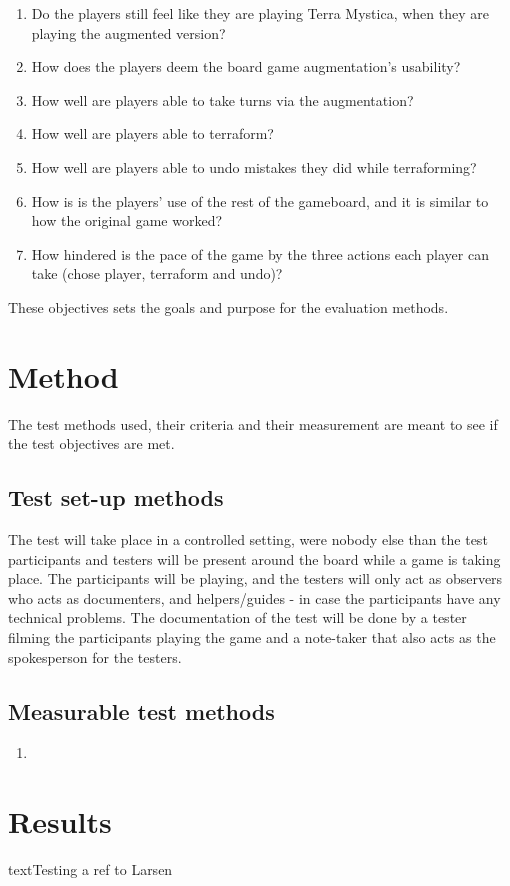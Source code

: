 \begin{enumerate}
\item Do the players still feel like they are playing Terra Mystica, when they are playing the augmented version? 
\item How does the players deem the board game augmentation's usability?
\item How well are players able to take turns via the augmentation? 
\item How well are players able to terraform? 
\item How well are players able to undo mistakes they did while terraforming?
\item How is is the players' use of the rest of the gameboard, and it is similar to how the original game worked?
\item How hindered is the pace of the game by the three actions each player can take (chose player, terraform and undo)?
\end{enumerate}

These objectives sets the goals and purpose for the evaluation methods. 

\section{Method}
The test methods used, their criteria and their measurement are meant to see if the test objectives are met.

\subsection{Test set-up methods}
The test will take place in a controlled setting, were nobody else than the test participants and testers will be present around the board while a game is taking place. The participants will be playing, and the testers will only act as observers who acts as documenters, and helpers/guides - in case the participants have any technical problems.
The documentation of the test will be done by a tester filming the participants playing the game and a note-taker that also acts as the spokesperson for the testers.

\subsection{Measurable test methods}
\begin{enumerate}
\item 
\end{enumerate}

\section{Results}
textTesting a ref to Larsen \citep{TestingLecture}